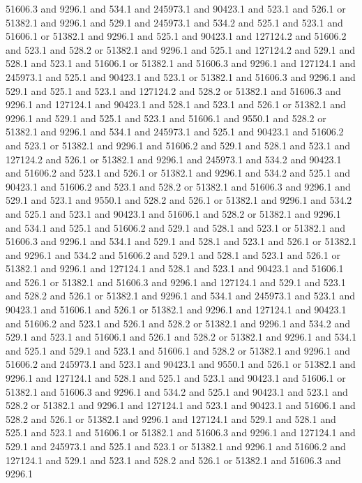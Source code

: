 51606.3 and 9296.1 and 534.1 and 245973.1 and 90423.1 and 523.1 and
526.1 or 51382.1 and 9296.1 and 529.1 and 245973.1 and 534.2 and 525.1
and 523.1 and 51606.1 or 51382.1 and 9296.1 and 525.1 and 90423.1 and
127124.2 and 51606.2 and 523.1 and 528.2 or 51382.1 and 9296.1 and
525.1 and 127124.2 and 529.1 and 528.1 and 523.1 and 51606.1 or
51382.1 and 51606.3 and 9296.1 and 127124.1 and 245973.1 and 525.1 and
90423.1 and 523.1 or 51382.1 and 51606.3 and 9296.1 and 529.1 and
525.1 and 523.1 and 127124.2 and 528.2 or 51382.1 and 51606.3 and
9296.1 and 127124.1 and 90423.1 and 528.1 and 523.1 and 526.1 or
51382.1 and 9296.1 and 529.1 and 525.1 and 523.1 and 51606.1 and
9550.1 and 528.2 or 51382.1 and 9296.1 and 534.1 and 245973.1 and
525.1 and 90423.1 and 51606.2 and 523.1 or 51382.1 and 9296.1 and
51606.2 and 529.1 and 528.1 and 523.1 and 127124.2 and 526.1 or
51382.1 and 9296.1 and 245973.1 and 534.2 and 90423.1 and 51606.2 and
523.1 and 526.1 or 51382.1 and 9296.1 and 534.2 and 525.1 and 90423.1
and 51606.2 and 523.1 and 528.2 or 51382.1 and 51606.3 and 9296.1 and
529.1 and 523.1 and 9550.1 and 528.2 and 526.1 or 51382.1 and 9296.1
and 534.2 and 525.1 and 523.1 and 90423.1 and 51606.1 and 528.2 or
51382.1 and 9296.1 and 534.1 and 525.1 and 51606.2 and 529.1 and 528.1
and 523.1 or 51382.1 and 51606.3 and 9296.1 and 534.1 and 529.1 and
528.1 and 523.1 and 526.1 or 51382.1 and 9296.1 and 534.2 and 51606.2
and 529.1 and 528.1 and 523.1 and 526.1 or 51382.1 and 9296.1 and
127124.1 and 528.1 and 523.1 and 90423.1 and 51606.1 and 526.1 or
51382.1 and 51606.3 and 9296.1 and 127124.1 and 529.1 and 523.1 and
528.2 and 526.1 or 51382.1 and 9296.1 and 534.1 and 245973.1 and 523.1
and 90423.1 and 51606.1 and 526.1 or 51382.1 and 9296.1 and 127124.1
and 90423.1 and 51606.2 and 523.1 and 526.1 and 528.2 or 51382.1 and
9296.1 and 534.2 and 529.1 and 523.1 and 51606.1 and 526.1 and 528.2
or 51382.1 and 9296.1 and 534.1 and 525.1 and 529.1 and 523.1 and
51606.1 and 528.2 or 51382.1 and 9296.1 and 51606.2 and 245973.1 and
523.1 and 90423.1 and 9550.1 and 526.1 or 51382.1 and 9296.1 and
127124.1 and 528.1 and 525.1 and 523.1 and 90423.1 and 51606.1 or
51382.1 and 51606.3 and 9296.1 and 534.2 and 525.1 and 90423.1 and
523.1 and 528.2 or 51382.1 and 9296.1 and 127124.1 and 523.1 and
90423.1 and 51606.1 and 528.2 and 526.1 or 51382.1 and 9296.1 and
127124.1 and 529.1 and 528.1 and 525.1 and 523.1 and 51606.1 or
51382.1 and 51606.3 and 9296.1 and 127124.1 and 529.1 and 245973.1 and
525.1 and 523.1 or 51382.1 and 9296.1 and 51606.2 and 127124.1 and
529.1 and 523.1 and 528.2 and 526.1 or 51382.1 and 51606.3 and 9296.1
